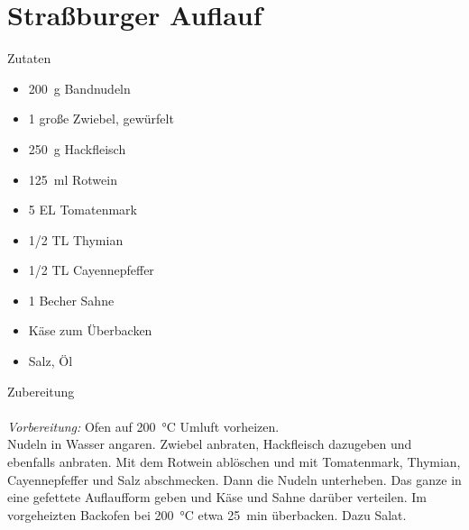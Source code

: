 \section*{Straßburger Auflauf}
\ihead{}\ohead{}
\cfoot{}
{\Large Zutaten}
\begin{multicols}{2}
\begin{itemize}
    \item \SI{200}{g} Bandnudeln
    \item \num{1} große Zwiebel, gewürfelt
    \item \SI{250}{g} Hackfleisch
    \item \SI{125}{ml} Rotwein
    \item \num{5} EL Tomatenmark
    \item \num{1/2} TL Thymian
    \item \num{1/2} TL Cayennepfeffer
    \item \num{1} Becher Sahne
    \item Käse zum Überbacken
    \item Salz, Öl
\end{itemize}
\end{multicols}
\noindent
{\Large Zubereitung}\\
\\
\textit{Vorbereitung:} Ofen auf \SI{200}{\celsius} Umluft vorheizen.\\
Nudeln in Wasser angaren.
Zwiebel anbraten, Hackfleisch dazugeben und ebenfalls anbraten.
Mit dem Rotwein ablöschen und mit Tomatenmark, Thymian, Cayennepfeffer und Salz abschmecken.
Dann die Nudeln unterheben. 
Das ganze in eine gefettete Auflaufform geben und Käse und Sahne darüber verteilen.
Im vorgeheizten Backofen bei \SI{200}{\celsius} etwa \SI{25}{min} überbacken.
Dazu Salat.
